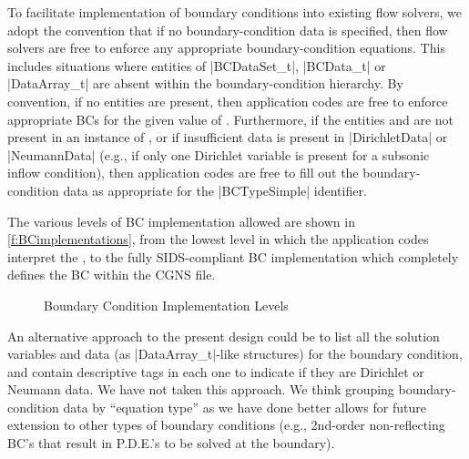 To facilitate implementation of boundary conditions into existing flow
solvers, we adopt the convention that if no boundary-condition data is
specified, then flow solvers are free to enforce any appropriate
boundary-condition equations.
This includes situations where entities of |BCDataSet_t|, |BCData_t|
or |DataArray_t| are absent within the boundary-condition hierarchy.
By convention, if no  entities are present, then
application codes are free to enforce appropriate BCs for the given
value of .
Furthermore, if the entities  and 
are not present in an instance of , or if
insufficient data is present in |DirichletData| or |NeumannData|
(e.g., if only one Dirichlet variable is present for a subsonic
inflow condition), then application codes are free to fill out
the boundary-condition data as appropriate for the |BCTypeSimple|
identifier.

The various levels of BC implementation allowed are shown in
\autoref{f:BCimplementations}, from the lowest level in which
the application codes interpret the , to the fully
SIDS-compliant BC implementation which completely defines the BC within
the CGNS file.

\setlength{\tmplength}{\unitlength}	%
\setlength{\unitlength}{\baselineskip}	%
\begin{figure}[!htb]
   \centering
   \begin{minipage}[b]{0.295\linewidth}
   \end{minipage}%
   \hfill%
   \begin{minipage}[b]{0.614\linewidth}
   \end{minipage}
   \caption{Boundary Condition Implementation Levels}
   \label{f:BCimplementations}
\end{figure}
\setlength{\unitlength}{\tmplength}	%

An alternative approach to the present design could be to list all the
solution variables and data (as |DataArray_t|-like structures) for the
boundary condition, and contain descriptive tags in each one to indicate
if they are Dirichlet or Neumann data.  We have not taken this approach.
We think grouping boundary-condition data by ``equation type'' as we have
done better allows for future extension to other types of boundary
conditions (e.g., 2nd-order non-reflecting BC's that result in P.D.E.'s
to be solved at the boundary).

